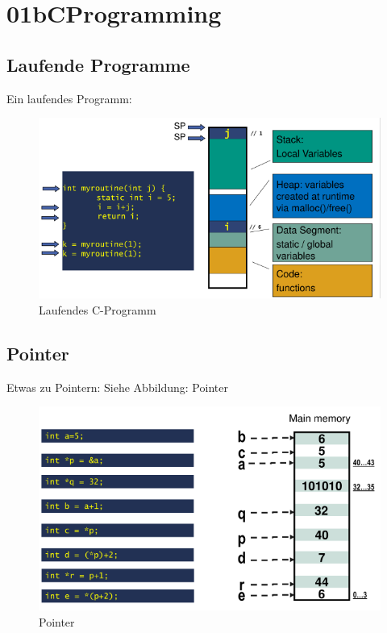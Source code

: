 \documentclass[a4paper]{scrreprt}
\begin{document}
\chapter{01bCProgramming}

\section{Laufende Programme}

Ein laufendes Programm:

\begin{figure}[ht]
\centering
\includegraphics[scale=0.6]{graphics/running_program.png}
\caption{Laufendes C-Programm}
\end{figure}

\section{Pointer}

Etwas zu Pointern: Siehe Abbildung: Pointer

\begin{figure}[ht]
\centering
\includegraphics[scale=0.6]{graphics/pointer.png}
\caption{Pointer}
\end{figure}
\end{document}
